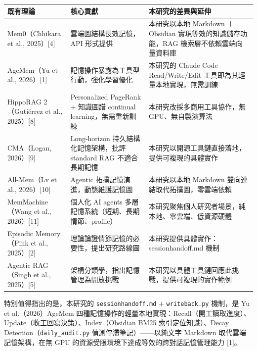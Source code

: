 {\def\LTcaptype{none} %
\begin{longtable}[]{@{}
  >{\raggedright\arraybackslash}p{}
  >{\raggedright\arraybackslash}p{}
  >{\raggedright\arraybackslash}p{}@{}}
\toprule\noalign{}
\begin{minipage}[b]{\linewidth}\raggedright
既有理論
\end{minipage} & \begin{minipage}[b]{\linewidth}\raggedright
核心貢獻
\end{minipage} & \begin{minipage}[b]{\linewidth}\raggedright
本研究的差異與延伸
\end{minipage} \\
\midrule\noalign{}
\endhead
\bottomrule\noalign{}
\endlastfoot
Mem0（Chhikara et al., 2025）{[}4{]} & 雲端圖結構長效記憶，API 形式提供 &
本研究以本地 Markdown ＋ Obsidian 實現等效的知識儲存功能，RAG
檢索層不依賴雲端向量資料庫 \\
AgeMem（Yu et al., 2026）{[}1{]} & 記憶操作暴露為工具型行動，強化學習優化 &
本研究的 Claude Code Read/Write/Edit 工具即為其輕量本地實現，無需訓練 \\
HippoRAG 2（Gutiérrez et al., 2025）{[}8{]} & Personalized PageRank +
知識圖譜 continual learning，無需重新訓練 &
本研究改採多商用工具協作，無 GPU、無自製演算法 \\
CMA（Logan, 2026）{[}9{]} & Long-horizon 持久結構化記憶架構，批評
standard RAG 不適合長期記憶 &
本研究以開源工具鏈直接落地，提供可複現的具體實作 \\
All-Mem（Lv et al., 2026）{[}10{]} & Agentic 拓撲記憶演進，動態維護記憶圖 &
本研究以本地 Markdown 雙向連結取代拓撲圖，零雲端依賴 \\
MemMachine（Wang et al., 2026）{[}11{]} & 個人化 AI agents
多層記憶系統（短期、長期情節、profile） &
本研究聚焦個人研究者場景，純本地、零雲端、低資源硬體 \\
Episodic Memory（Pink et al., 2025）{[}2{]} &
理論論證情節記憶的必要性，提出研究路線圖 &
本研究提供具體實作：sessionhandoff.md 機制 \\
Agentic RAG（Singh et al., 2025）{[}5{]} & 架構分類學，指出記憶管理為開放挑戰 &
本研究以具體工具鏈回應此挑戰，提供可複現的實作範例 \\
\end{longtable}
}

特別值得指出的是，本研究的 \texttt{sessionhandoff.md} +
\texttt{writeback.py} 機制，是 Yu et al.（2026）AgeMem
四種記憶操作的輕量本地實現：Recall（開工讀取進度）、Update（收工回寫決策）、Index（Obsidian
BM25 索引定位知識）、Decay Detection（\texttt{daily\_audit.py}
偵測停滯筆記）------以純文字 Markdown 取代雲端記憶架構，在無 GPU
的資源受限環境下達成等效的跨對話記憶管理能力 {[}1{]}。


